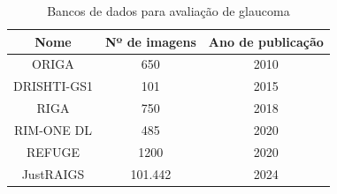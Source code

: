 \documentclass[12pt]{article}
\begin{document}

\begin{table}[htb]
    \centering
    \begin{tabular}{|c|c|c|}
    \hline
    Nome & Nº de imagens & Ano de publicação \\
    \hline
    ORIGA & 650 & 2010 \\
    \hline
    DRISHTI-GS1 & 101 & 2015 \\
    \hline
    RIGA & 750 & 2018 \\
    \hline
    RIM-ONE DL & 485 & 2020 \\
    \hline
    REFUGE & 1200 & 2020 \\
    \hline
    JustRAIGS & 101.442 & 2024 \\
    \hline
    \end{tabular}
    \caption{Bancos de dados para avaliação de glaucoma}
    \label{tab:datasets}
\end{table}
\end{document}
